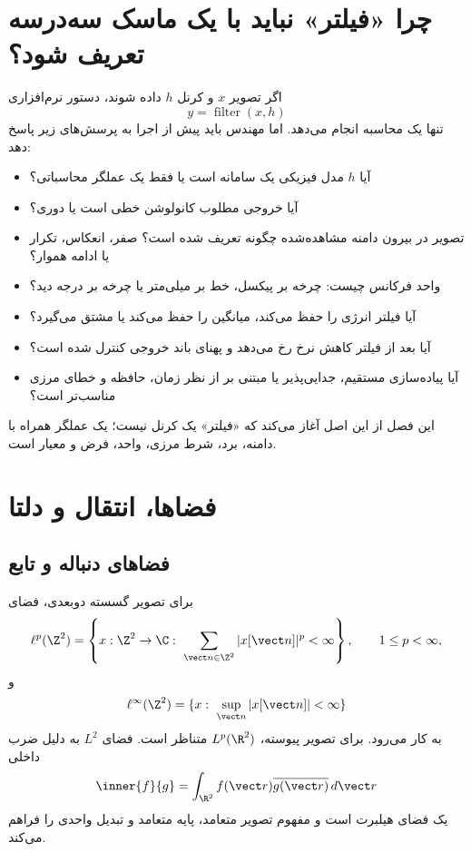 \section{چرا «فیلتر» نباید با یک ماسک سه‌درسه تعریف شود؟}

اگر تصویر \(x\) و کرنل \(h\) داده شوند، دستور نرم‌افزاری
\begin{equation}
y=\operatorname{filter}(x,h)
\end{equation}
تنها یک محاسبه انجام می‌دهد. اما مهندس باید پیش از اجرا به پرسش‌های زیر پاسخ دهد:
\begin{itemize}
\item آیا \(h\) مدل فیزیکی یک سامانه است یا فقط یک عملگر محاسباتی؟
\item آیا خروجی مطلوب کانولوشن خطی است یا دوری؟
\item تصویر در بیرون دامنه مشاهده‌شده چگونه تعریف شده است؟ صفر، انعکاس، تکرار یا ادامه هموار؟
\item واحد فرکانس چیست: چرخه بر پیکسل، خط بر میلی‌متر یا چرخه بر درجه دید؟
\item آیا فیلتر انرژی را حفظ می‌کند، میانگین را حفظ می‌کند یا مشتق می‌گیرد؟
\item آیا بعد از فیلتر کاهش نرخ رخ می‌دهد و پهنای باند خروجی کنترل شده است؟
\item آیا پیاده‌سازی مستقیم، جدایی‌پذیر یا مبتنی بر  از نظر زمان، حافظه و خطای مرزی مناسب‌تر است؟
\end{itemize}

این فصل از این اصل آغاز می‌کند که «فیلتر» یک کرنل نیست؛ یک عملگر همراه با دامنه، برد، شرط مرزی،
واحد، فرض و معیار است.

\section{فضاها، انتقال و دلتا}

\subsection{فضاهای دنباله و تابع}
برای تصویر گسسته دوبعدی، فضای
\begin{equation}
\ell^p(\Z^2)=\left\{x:\Z^2\to\C:\ \sum_{\vect n\in\Z^2}|x[\vect n]|^p<\infty\right\},
\qquad 1\le p<\infty,
\end{equation}
و
\begin{equation}
\ell^\infty(\Z^2)=\{x:\ \sup_{\vect n}|x[\vect n]|<\infty\}
\end{equation}
به کار می‌رود. برای تصویر پیوسته، \(L^p(\R^2)\) متناظر است. فضای \(L^2\) به دلیل ضرب داخلی
\begin{equation}
\inner{f}{g}=\int_{\R^2} f(\vect r)\overline{g(\vect r)}\,d\vect r
\end{equation}
یک فضای هیلبرت است و مفهوم تصویر متعامد، پایه متعامد و تبدیل واحدی را فراهم می‌کند.

